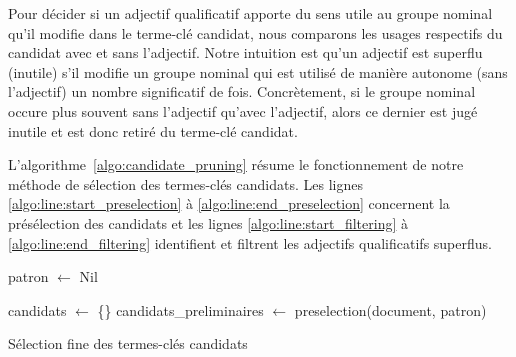         Pour décider si un adjectif qualificatif apporte du sens utile au groupe
        nominal qu'il modifie dans le terme-clé candidat, nous comparons les
        usages respectifs du candidat avec et sans l'adjectif. Notre intuition
        est qu'un adjectif est superflu (inutile) s'il modifie un groupe nominal
        qui est utilisé de manière autonome (sans l'adjectif) un nombre
        significatif de fois. Concrètement, si le groupe nominal occure plus
        souvent sans l'adjectif qu'avec l'adjectif, alors ce dernier est jugé
        inutile et est donc retiré du terme-clé candidat.

        L'algorithme~\ref{algo:candidate_pruning} résume le fonctionnement de
        notre méthode de sélection des termes-clés candidats. Les lignes
        \ref{algo:line:start_preselection} à \ref{algo:line:end_preselection}
        concernent la présélection des candidats et les lignes
        \ref{algo:line:start_filtering} à \ref{algo:line:end_filtering}
        identifient et filtrent les adjectifs qualificatifs superflus.
        \begin{algorithm}
          \DontPrintSemicolon{}

          \BlankLine

          patron $\leftarrow$ Nil\;\label{algo:line:start_preselection}

          candidats $\leftarrow$ \{\}\;
          candidats\_preliminaires $\leftarrow$ preselection(document, patron)\;\label{algo:line:end_preselection}

          \label{algo:line:end_filtering}

          \caption{Sélection fine des termes-clés candidats
                   \label{algo:candidate_pruning}}
        \end{algorithm}

